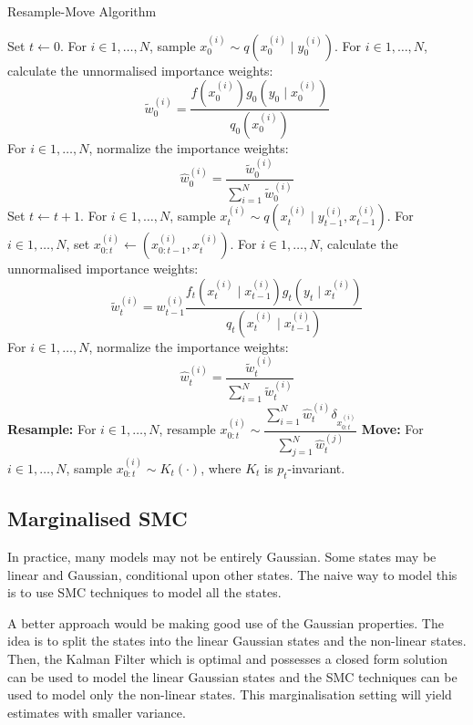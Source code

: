 \begin{algorithm}
\caption{Resample-Move Algorithm}\label{algo:rm}
\begin{algorithmic}[1]
\State Set $t \gets 0$.
\State For $i \in 1, \ldots, N$, sample $x^{(i)}_0 \sim q(x^{(i)}_0 \mid y^{(i)}_0)$.
\State For $i \in 1, \ldots, N$, calculate the unnormalised importance weights:
\begin{equation*}
 \tilde{w}^{(i)}_0 = \dfrac{f(x_0^{(i)})g_0(y_0 \mid x^{(i)}_0)}{q_0(x^{(i)}_0)}
\end{equation*}
\State For $i \in 1, \ldots, N$, normalize the importance weights:
\begin{equation*}
\hat{w}^{(i)}_0 = \dfrac{\tilde{w}^{(i)}_0}{\sum^N_{i=1} \tilde{w}^{(i)}_0}
\end{equation*}
\State Set $t \gets t + 1$.
\State For $i \in 1, \ldots, N$, sample $x^{(i)}_t \sim q(x^{(i)}_t \mid y^{(i)}_{t-1}, x^{(i)}_{t-1})$.
\State For $i \in 1, \ldots, N$, set $x^{(i)}_{0:t} \gets (x^{(i)}_{0:t-1}, x^{(i)}_t)$.
\State For $i \in 1, \ldots, N$, calculate the unnormalised importance weights:
\begin{equation*}
 \tilde{w}^{(i)}_t = w^{(i)}_{t-1} \dfrac{f_t(x^{(i)}_t \mid x^{(i)}_{t-1})g_t(y_t \mid x^{(i)}_t)}{q_t(x^{(i)}_t \mid x^{(i)}_{t-1})}
\end{equation*}
\State For $i \in 1, \ldots, N$, normalize the importance weights:
\begin{equation*}
\hat{w}^{(i)}_t = \dfrac{\tilde{w}^{(i)}_t}{\sum^N_{i=1} \tilde{w}^{(i)}_t}
\end{equation*}
\State \textbf{Resample:} For $i \in 1, \ldots, N$, resample $ x^{(i)}_{0:t} \sim \dfrac{\sum^N_{i=1}\hat{w}^{(i)}_t\delta_{x^{(i)}_{0:t}}}{\sum^N_{j=1} \hat{w}^{(j)}_t}$
\State \textbf{Move:} For $i \in 1, \ldots, N$, sample $x^{(i)}_{0:t} \sim K_t(\cdot)$, where $K_t$ is $p_t$-invariant.
\EndWhile
\EndFunction
\end{algorithmic}
\end{algorithm}

\subsection{Marginalised SMC}
\label{sec:msmc}
In practice, many models may not be entirely Gaussian. Some states may be linear and Gaussian, conditional upon other states. The naive way to model this is to use SMC techniques to model all the states.

A better approach would be making good use of the Gaussian properties. The idea is to split the states into the linear Gaussian states and the non-linear states. Then, the Kalman Filter which is optimal and possesses a closed form solution can be used to model the linear Gaussian states and the SMC techniques can be used to model only the non-linear states. This marginalisation setting will yield estimates with smaller variance. 

